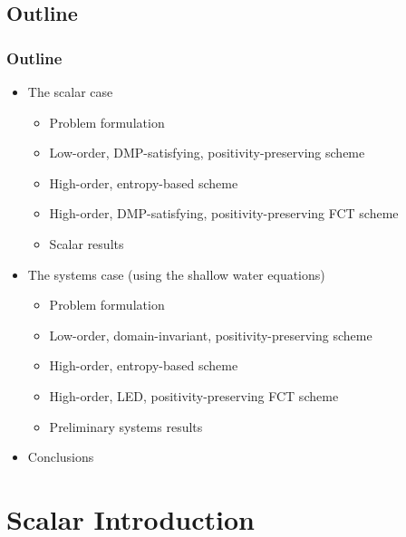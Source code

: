 \documentclass{beamer} \useoutertheme{infolines}
\begin{document}
\subsection{Outline}
\begin{frame}
\frametitle{Outline}

\begin{itemize}
   \item The scalar case
   \begin{itemize}
      \item Problem formulation
      \item Low-order, DMP-satisfying, positivity-preserving scheme
      \item High-order, entropy-based scheme
      \item High-order, DMP-satisfying, positivity-preserving FCT scheme
      \item Scalar results
   \end{itemize}
   \item The systems case (using the shallow water equations)
   \begin{itemize}
      \item Problem formulation
      \item Low-order, domain-invariant, positivity-preserving scheme
      \item High-order, entropy-based scheme
      \item High-order, LED, positivity-preserving FCT scheme
      \item Preliminary systems results
   \end{itemize}
   \item Conclusions
\end{itemize}

\end{frame}
\section{Scalar Introduction}
\end{document}
